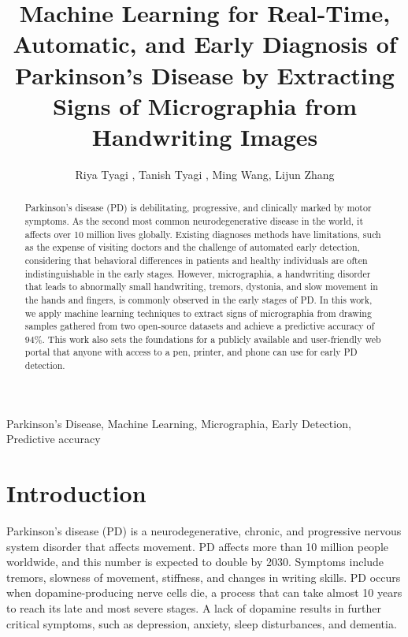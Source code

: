 \documentclass[pmlr,twocolumn,10pt,breaklinks, x11names,table]{jmlr} %
\title[Machine Learning for Diagnosis of Parkinson's Disease]{Machine Learning for Real-Time, Automatic, and Early Diagnosis of Parkinson’s Disease by Extracting Signs of Micrographia from Handwriting Images}
\author{Riya Tyagi \nametag{\thanks{Authors contributed equally}},
Tanish Tyagi \nametag{\footnotemark[1]}, 
Ming Wang,
Lijun Zhang
\centering \Email{ 
\\[\bigskipamount]  
rtyagi@exeter.edu, ttyagi@mgh.harvard.edu, mwang@phs.psu.edu, lzhang6@pennstathealth.psu.edu}
}
\begin{document}
\maketitle

\begin{abstract}
Parkinson’s disease (PD) is debilitating, progressive, and clinically marked by motor symptoms. As the second most common neurodegenerative disease in the world, it affects over 10 million lives globally. Existing diagnoses methods have limitations, such as the expense of visiting doctors and the challenge of automated early detection, considering that behavioral differences in patients and healthy individuals are often indistinguishable in the early stages. However, micrographia, a handwriting disorder that leads to abnormally small handwriting, tremors, dystonia, and slow movement in the hands and fingers, is commonly observed in the early stages of PD. In this work, we apply machine learning techniques to extract signs of micrographia from drawing samples gathered from two open-source datasets and achieve a predictive accuracy of 94\%. This work also sets the foundations for a publicly available and user-friendly web portal that anyone with access to a pen, printer, and phone can use for early PD detection.
\end{abstract}

\begin{keywords}
Parkinson’s Disease, Machine Learning, Micrographia, Early Detection, Predictive accuracy
\end{keywords}

\section{Introduction}
\label{sec:intro}

Parkinson’s disease (PD) is a neurodegenerative, chronic, and progressive nervous system disorder that affects movement. PD affects more than 10 million people worldwide, and this number is expected to double by 2030. \citep{choi2017refining} Symptoms include tremors, slowness of movement, stiffness, and changes in writing skills. PD occurs when dopamine-producing nerve cells die, a process that can take almost 10 years to reach its late and most severe stages. A lack of dopamine results in further critical symptoms, such as depression, anxiety, sleep disturbances, and dementia. 
\end{document}
